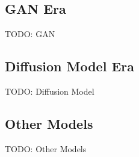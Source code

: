 

\subsection{GAN Era}
TODO: GAN

\subsection{Diffusion Model Era}
TODO: Diffusion Model

\subsection{Other Models}
TODO: Other Models